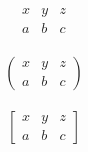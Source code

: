 \documentclass{article}
\begin{document}
\begin{align*}
  \begin{matrix}
    x & y & z \\
    a & b & c
  \end{matrix}
\end{align*}



\begin{align*}
  \begin{pmatrix}
    x & y & z \\
    a & b & c
  \end{pmatrix}
\end{align*}



\begin{align*}
  \begin{bmatrix}
    x & y & z \\
    a & b & c
  \end{bmatrix}
\end{align*}
\end{document}
